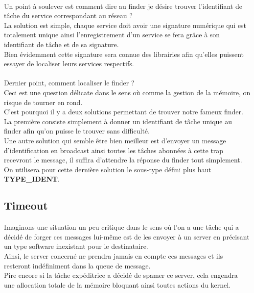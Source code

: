 \documentclass[10pt,a4wide]{article}
\begin{document}
\paragraph{}

Un point \`a soulever est comment dire au finder je d\'esire trouver l'identifiant de t\^ache du service correspondant au r\'eseau ?\\
La solution est simple, chaque service doit avoir une signature num\'erique qui est totalement unique ainsi l'enregistrement d'un service
se fera gr\^ace \`a son identifiant de t\^ache et de sa signature.\\
Bien \'evidemment cette signature sera connue des librairies afin qu'elles puissent essayer de localiser leurs services respectifs.

\paragraph{}

Dernier point, comment localiser le finder ?\\
Ceci est une question d\'elicate dans le sens o\`u comme la gestion de la m\'emoire, on risque de tourner en rond.\\
C'est pourquoi il y a deux solutions permettant de trouver notre fameux finder.\\
La premi\`ere consiste simplement \`a donner un identifiant de t\^ache unique au finder afin qu'on puisse le trouver
sans difficult\'e.\\
Une autre solution qui semble \^etre bien meilleur est d'envoyer un message d'identification en broadcast ainsi toutes les t\^aches abonn\'ees
\`a cette trap recevront le message, il suffira d'attendre la r\'eponse du finder tout simplement.\\
On utilisera pour cette derni\`ere solution le sous-type d\'efini plus haut \textbf{TYPE\_IDENT}.

\subsection{Timeout}

\paragraph{}

Imaginons une situation un peu critique dans le sens o\`u l'on a une t\^ache qui a d\'ecid\'e de forger ces messages lui-m\^eme est de les envoyer
\`a un server en pr\'ecisant un type software inexistant pour le destinataire.\\
Ainsi, le server concern\'e ne prendra jamais en compte ces messages et ils resteront ind\'efiniment dans la queue de message.\\
Pire encore si la t\^ache exp\'editrice a d\'ecid\'e de spamer ce server, cela engendra une allocation totale de la m\'emoire bloquant ainsi toutes
actions du kernel.
\end{document}
